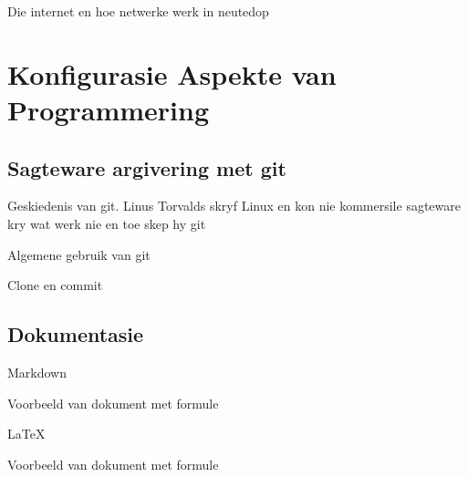 Die internet en hoe netwerke werk in neutedop

\part[Konfigurasie Aspekte]
{Konfigurasie Aspekte van\\ Programmering}

\chapter[git]
{Sagteware argivering met git}



Geskiedenis van git. Linus Torvalds skryf Linux en kon nie kommersile sagteware kry wat werk nie en toe skep hy git

Algemene gebruik van git

Clone en commit

\chapter[Dokumentasie]
{Dokumentasie}


Markdown 

Voorbeeld van dokument met formule

LaTeX

Voorbeeld van dokument met formule

